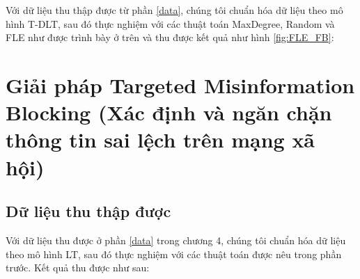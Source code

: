 Với dữ liệu thu thập được từ phần \ref{data}, chúng tôi chuẩn hóa dữ liệu theo mô hình T-DLT, sau đó thực nghiệm với các thuật toán MaxDegree, Random và FLE như được trình bày ở trên và thu được kết quả như hình \ref{fig:FLE_FB}:



\section{Giải pháp Targeted Misinformation Blocking (Xác định và ngăn chặn thông tin sai lệch trên mạng xã hội)}


\subsection{Dữ liệu thu thập được}	
Với dữ liệu thu được ở phần \ref{data} trong chương 4, chúng tôi chuẩn hóa dữ liệu theo mô hình LT, sau đó thực nghiệm với các thuật toán được nêu trong phần trước. Kết quả thu được như sau:



